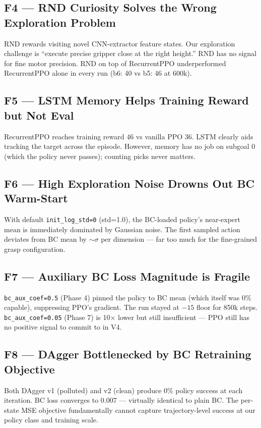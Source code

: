\documentclass[11pt,letterpaper]{article}
\begin{document}
\subsection{F4 — RND Curiosity Solves the Wrong Exploration Problem}

RND rewards visiting novel CNN-extractor feature states. Our exploration
challenge is ``execute precise gripper close at the right height.'' RND has no
signal for fine motor precision. RND on top of RecurrentPPO underperformed
RecurrentPPO alone in every run (b6: 40 vs b5: 46 at 600k).

\subsection{F5 — LSTM Memory Helps Training Reward but Not Eval}

RecurrentPPO reaches training reward 46 vs vanilla PPO 36. LSTM clearly aids
tracking the target across the episode. However, memory has no job on subgoal 0
(which the policy never passes); counting picks never matters.

\subsection{F6 — High Exploration Noise Drowns Out BC Warm-Start}

With default \texttt{init\_log\_std=0} (std=1.0), the BC-loaded policy's near-expert
mean is immediately dominated by Gaussian noise. The first sampled action deviates
from BC mean by $\sim\sigma$ per dimension — far too much for the fine-grained
grasp configuration.

\subsection{F7 — Auxiliary BC Loss Magnitude is Fragile}

\texttt{bc\_aux\_coef=0.5} (Phase 4) pinned the policy to BC mean (which itself was
0\% capable), suppressing PPO's gradient. The run stayed at $-15$ floor for 850k
steps. \texttt{bc\_aux\_coef=0.05} (Phase 7) is 10$\times$ lower but still
insufficient — PPO still has no positive signal to commit to in V4.

\subsection{F8 — DAgger Bottlenecked by BC Retraining Objective}

Both DAgger v1 (polluted) and v2 (clean) produce 0\% policy success at each
iteration. BC loss converges to 0.007 — virtually identical to plain BC.
The per-state MSE objective fundamentally cannot capture trajectory-level success
at our policy class and training scale.
\end{document}
